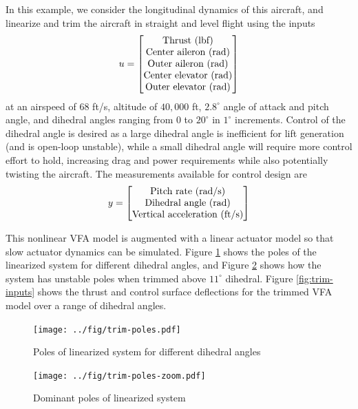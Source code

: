 \documentclass[english]{ifacconf}
\begin{document}
In this example, we consider the longitudinal dynamics of this aircraft, and linearize and trim the aircraft in straight and level flight using the inputs
\begin{equation}
	u = \begin{bmatrix}
		$Thrust (lbf)$\\
		$Center aileron (rad)$\\
		$Outer aileron (rad)$\\
		$Center elevator (rad)$\\
		$Outer elevator (rad)$
	\end{bmatrix}
\end{equation}
at an airspeed of $68$ ft/s, altitude of $40,000$ ft, $2.8^\circ$ angle of attack and pitch angle, and dihedral angles ranging from $0$ to $20^\circ$ in $1^\circ$ increments. Control of the dihedral angle is desired as a large dihedral angle is inefficient for lift generation (and is open-loop unstable), while a small dihedral angle will require more control effort to hold, increasing drag and power requirements while also potentially twisting the aircraft. The measurements available for control design are
\begin{equation}
y = \begin{bmatrix}
	$Pitch rate (rad/s)$\\
	$Dihedral angle (rad)$\\
	$Vertical acceleration (ft/s)$
\end{bmatrix}	
\end{equation}

This nonlinear VFA model is augmented with a linear actuator model so that slow actuator dynamics can be simulated. Figure \ref{fig:trim-poles} shows the poles of the linearized system for different dihedral angles, and Figure \ref{fig:trim-poles-zoom} shows how the system has unstable poles when trimmed above $11^\circ$ dihedral. Figure \ref{fig:trim-inputs} shows the thrust and control surface deflections for the trimmed VFA model over a range of dihedral angles.

\begin{figure}[htbp]
	\centering
	\texttt{[image: ../fig/trim-poles.pdf]}
	\caption{Poles of linearized system for different dihedral angles}
	\label{fig:trim-poles}
\end{figure}

\begin{figure}[htbp]
	\centering
	\texttt{[image: ../fig/trim-poles-zoom.pdf]}
	\caption{Dominant poles of linearized system}
	\label{fig:trim-poles-zoom}
\end{figure}
\end{document}
